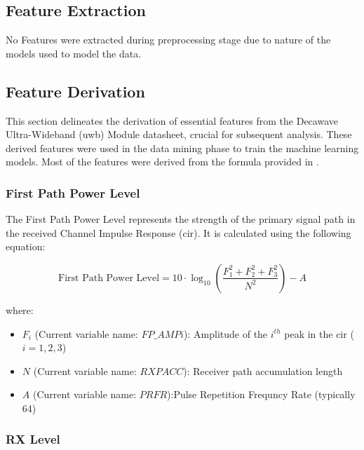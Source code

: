 \subsection{Feature Extraction}\label{feature_extraction}

No Features were extracted during preprocessing stage due to nature of the models used to model the data.


\subsection{Feature Derivation}\label{feature_derivation}

This section delineates the derivation of essential features from the Decawave Ultra-Wideband (\acrshort{uwb}) Module datasheet, crucial for subsequent analysis. These derived features were used in the data mining phase to train the machine learning models. Most of the features were derived from the formula provided in \cite{DecawaveDW1000}.

\subsubsection{First Path Power Level}\label{first_path_power_level}

The First Path Power Level represents the strength of the primary signal path in the received Channel Impulse Response (\acrshort{cir}). It is calculated using the following equation:

\begin{equation}
  \text{First Path Power Level} = 10 \cdot \log_{10} \left( \frac{F_1^2 + F_2^2 + F_3^2}{N^2} \right) - A
\end{equation}

where:

\begin{itemize}
  \item $F_i$ (Current variable name: $FP\_AMPi$): Amplitude of the $i^{th}$ peak in the \acrshort{cir} ($i = 1, 2, 3$)
  \item $N$ (Current variable name: $RXPACC$): Receiver path accumulation length
  \item $A$ (Current variable name: $PRFR$):Pulse Repetition Frequncy Rate (typically 64)
\end{itemize}

\subsubsection{RX Level}\label{rx_level}

